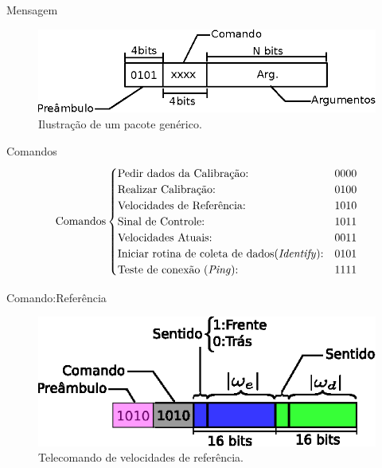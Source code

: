 \begin{frame}{Mensagem}
    \begin{figure}
        \centering
        \includegraphics[width=1.0\textwidth]{figuras/ilustracoes/ilustracao_frame_generico.eps}
        \caption{Ilustração de um pacote genérico.}
    \end{figure}
\end{frame}

\begin{frame}{Comandos}
    \begin{align*}
    \text{Comandos}
        \begin{cases}
            \text{Pedir dados da Calibração:} & 0000\\
            \text{Realizar Calibração:} & 0100\\
            \text{Velocidades de Referência:} & 1010\\
            \text{Sinal de Controle:} & 1011\\
            \text{Velocidades Atuais:} & 0011\\
            \text{Iniciar rotina de coleta de dados(\emph{Identify}):} & 0101\\
            \text{Teste de conexão (\emph{Ping}):} & 1111
        \end{cases}
    \end{align*}
\end{frame}

\begin{frame}{Comando:Referência}
    \begin{figure}
        \centering
        \includegraphics[width=\textwidth]{figuras/ilustracoes/ilustracao_comando_omega_ref.eps}
        \caption{Telecomando de velocidades de referência.}
    \end{figure}
\end{frame}

